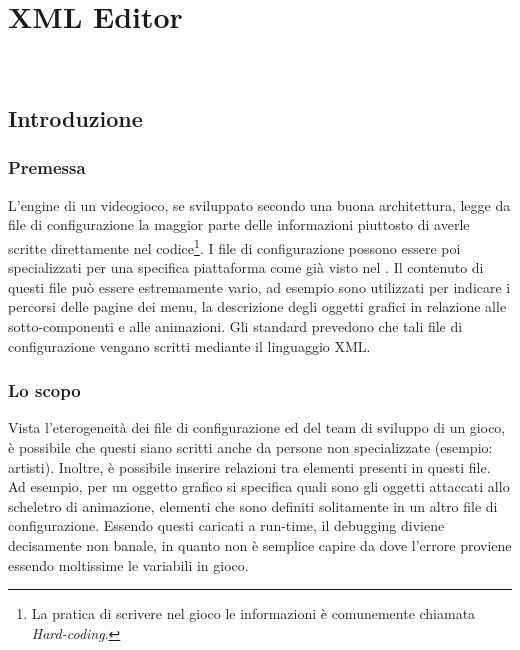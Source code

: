 
\chapter{XML Editor}
\label{cap:xml-editor}

\\

\section{Introduzione}

	\subsection{Premessa}
		L'engine di un videogioco, se sviluppato secondo una buona architettura, legge da file di configurazione la maggior parte delle informazioni piuttosto di averle scritte direttamente nel codice\footnote{La pratica di scrivere nel gioco le informazioni è comunemente chiamata \textit{Hard-coding}.}. I file di configurazione possono essere poi specializzati per una specifica piattaforma come già visto nel . Il contenuto di questi file può essere estremamente vario, ad esempio sono utilizzati per indicare i percorsi delle pagine dei menu, la descrizione degli oggetti grafici in relazione alle sotto-componenti e alle animazioni. Gli standard prevedono che tali file di configurazione vengano scritti mediante il linguaggio XML.

	\subsection{Lo scopo}
		Vista l'eterogeneità dei file di configurazione ed del team di sviluppo di un gioco, è possibile che questi siano scritti anche da persone non specializzate (esempio: artisti). Inoltre, è possibile inserire relazioni tra elementi presenti in questi file. Ad esempio, per un oggetto grafico si specifica quali sono gli oggetti attaccati allo scheletro di animazione, elementi che sono definiti solitamente in un altro file di configurazione. Essendo questi caricati a run-time, il debugging diviene decisamente non banale, in quanto non è semplice capire da dove l'errore proviene essendo moltissime le variabili in gioco.\\
		
